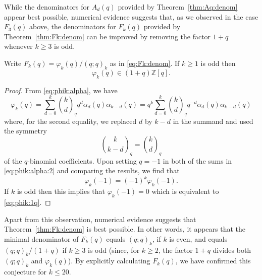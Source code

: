 \documentclass[11pt]{article}
\theoremstyle{plain}
\theoremstyle{definition}
\begin{document}
While the denominators for $A_d (q)$ provided by Theorem~\ref{thm:Aq:denom}
appear best possible, numerical evidence suggests that, as we observed in the
case $F_3 (q)$ above, the denominators for $F_k (q)$ provided by
Theorem~\ref{thm:Fk:denom} can be improved by removing the factor $1 + q$
whenever $k \geq 3$ is odd.

\begin{lemma}
  \label{lem:Fk:denom:odd}Write $F_k (q) = \varphi_k (q) / (q ; q)_k$ as in
  \eqref{eq:Fk:denom}. If $k \geq 1$ is odd then
  \begin{equation}
    \varphi_k (q) \in (1 + q) \mathbb{Z} [q] . \label{eq:phik:1q}
  \end{equation}
\end{lemma}

\begin{proof}
  From \eqref{eq:phik:alpha}, we have
  \begin{equation}
    \varphi_k (q) = \sum_{d = 0}^k \binom{k}{d}_q q^d \alpha_d (q) \alpha_{k -
    d} (q) = q^k \sum_{d = 0}^k \binom{k}{d}_q q^{- d} \alpha_d (q) \alpha_{k
    - d} (q) \label{eq:phik:alpha:2}
  \end{equation}
  where, for the second equality, we replaced $d$ by $k - d$ in the summand
  and used the symmetry
  \begin{equation*}
    \binom{k}{k - d}_q = \binom{k}{d}_q
  \end{equation*}
  of the $q$-binomial coefficients. Upon setting $q = - 1$ in both of the sums
  in \eqref{eq:phik:alpha:2} and comparing the results, we find that
  \begin{equation*}
    \varphi_k (- 1) = (- 1)^k \varphi_k (- 1) .
  \end{equation*}
  If $k$ is odd then this implies that $\varphi_k (- 1) = 0$ which is
  equivalent to \eqref{eq:phik:1q}.
\end{proof}

Apart from this observation, numerical evidence suggests that
Theorem~\ref{thm:Fk:denom} is best possible. In other words, it appears that
the minimal denominator of $F_k (q)$ equals $(q ; q)_k$, if $k$ is even, and
equals $(q ; q)_k / (1 + q)$ if $k \geq 3$ is odd (since, for $k
\geq 2$, the factor $1 + q$ divides both $(q ; q)_k$ and $\varphi_k
(q)$). By explicitly calculating $F_k (q)$, we have confirmed this conjecture
for $k \leq 20$.
\end{document}
